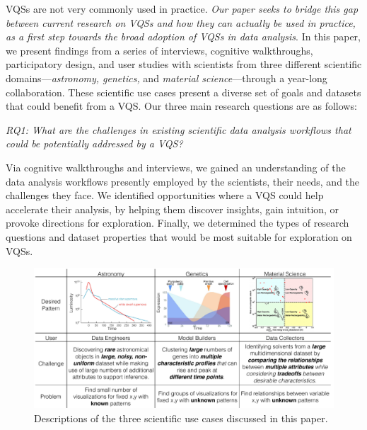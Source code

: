 VQSs are not very commonly used in practice.
{\em Our paper seeks to bridge this gap between current research on VQSs  and how they can actually be used in practice, as a first step towards the broad adoption of VQSs in data analysis}. 
In this paper, we present findings from a series of interviews, cognitive walkthroughs, participatory design, and user studies with scientists from three different scientific 
domains---{\em astronomy, genetics,} and {\em material science}---through a year-long collaboration.
These scientific use cases present a diverse set of goals and datasets that could benefit from a VQS. Our three main research questions are as follows:
\par \emph{RQ1: What are the challenges in existing scientific data analysis workflows that could be potentially addressed by a VQS?}

Via cognitive walkthroughs and interviews,
we gained an understanding of the data analysis 
workflows presently employed by the scientists, their needs,
and the challenges they face. 
We identified opportunities where a VQS could
help accelerate their analysis, by helping them
discover insights, gain intuition, or provoke directions
for exploration. Finally, we determined the types of 
research questions and dataset properties that would
be most suitable for exploration on VQSs.
\begin{figure}[ht!]
\centering
\vspace{-15pt}
\includegraphics[width=0.8\linewidth]{figures/sci_challenge_tbl.pdf}
\vspace{-6pt}\caption{Descriptions of the three scientific use cases discussed in this paper.}
\label{example}
\vspace{-10pt}
\end{figure}

